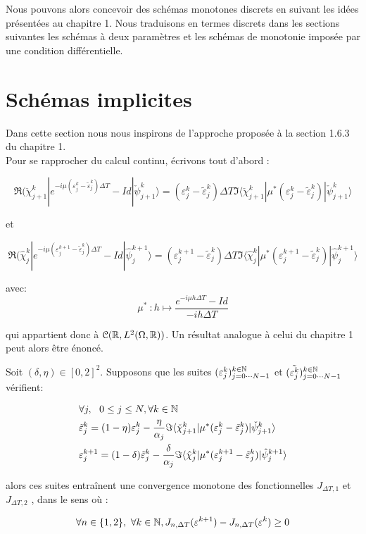 Nous pouvons alors concevoir des schémas monotones discrets en suivant les idées présentées au chapitre 1. Nous traduisons en termes discrets dans les sections suivantes les schémas à deux paramètres et les schémas de monotonie imposée par une condition différentielle.

\section{Schémas implicites}

Dans cette section nous nous inspirons de l’approche proposée à la section 1.6.3 du chapitre 1.
\\Pour se rapprocher du calcul continu, écrivons tout d’abord :

$$ \Re(\check{\chi}^k_{j+1}|e^{-i\mu(\varepsilon^k_j-\tilde{\varepsilon}^k_j)\Delta T}-Id|\check{\psi}^k_{j+1}\rangle = (\varepsilon_j^k - \tilde{\varepsilon}_j^k) \Delta T \Im \langle  \check{\chi}^k_{j+1}|\mu^*(\varepsilon^k_j-\tilde{\varepsilon}^k_j)|\check{\psi}^k_{j+1} \rangle$$

et

$$ \Re(\hat{\chi}^k_{j}|e^{-i\mu(\varepsilon^{k+1}_j-\tilde{\varepsilon}^k_j)\Delta T}-Id|\hat{\psi}^{k+1}_j\rangle = (\varepsilon_j^{k+1} - \tilde{\varepsilon}_j^k) \Delta T \Im \langle  \hat{\chi}^k_{j}|\mu^*(\varepsilon^{k+1}_j-\tilde{\varepsilon}^k_j)|\hat{\psi}^{k+1}_{j} \rangle$$

avec:
\begin{equation}
\mu^*\ :h \mapsto \frac{e^{-i\mu h \Delta T} -Id}{-ih\Delta T}
\end{equation}

qui appartient donc à $\mathcal{C}(\mathbb R, L^2( \Omega, \mathbb R))$. Un résultat analogue à celui du chapitre 1 peut alors être énoncé.

\begin{theorem}
	
	Soit $(\delta,\eta) \in [0,2]^2$. Supposons que les suites 
	$(\varepsilon_j^k)^{k\in\mathbb N}_{j = 0\cdots N-1}$ et $(\tilde{\varepsilon_j^k})^{k\in\mathbb N}_{j = 0\cdots N-1}$ vérifient:
	
	\begin{align}
	&\forall j, \ \ 0\leq j\leq N, \forall k \in \mathbb N \\ \nonumber
	&\tilde{\varepsilon}^k_j = (1-\eta)\varepsilon^k_j - \frac{\eta}{\alpha_j} \Im \langle  \check{\chi}^k_{j+1}|\mu^*(\varepsilon^k_j-\tilde{\varepsilon}^k_j)|\check{\psi}^k_{j+1} \rangle\\
	&\varepsilon^{k+1}_j = (1-\delta)\tilde{\varepsilon}^k_j - \frac{\delta}{\alpha_j} \Im \langle  \hat{\chi}^k_{j}|\mu^*(\varepsilon^{k+1}_j-\tilde{\varepsilon}^k_j)|\hat{\psi}^{k+1}_{j} \rangle \nonumber
	\end{align}
	
	alors ces suites entraînent une convergence monotone des fonctionnelles $J_{\Delta T,1}$ et $J_{\Delta T,2}$ , dans le sens où :
	
	$$ \forall n \in \{1,2\},\  \forall k \in \mathbb N, J_{n,\Delta T}(\varepsilon^{k+1}) - J_{n,\Delta T}(\varepsilon^k)\geq 0 $$
	
\end{theorem}

